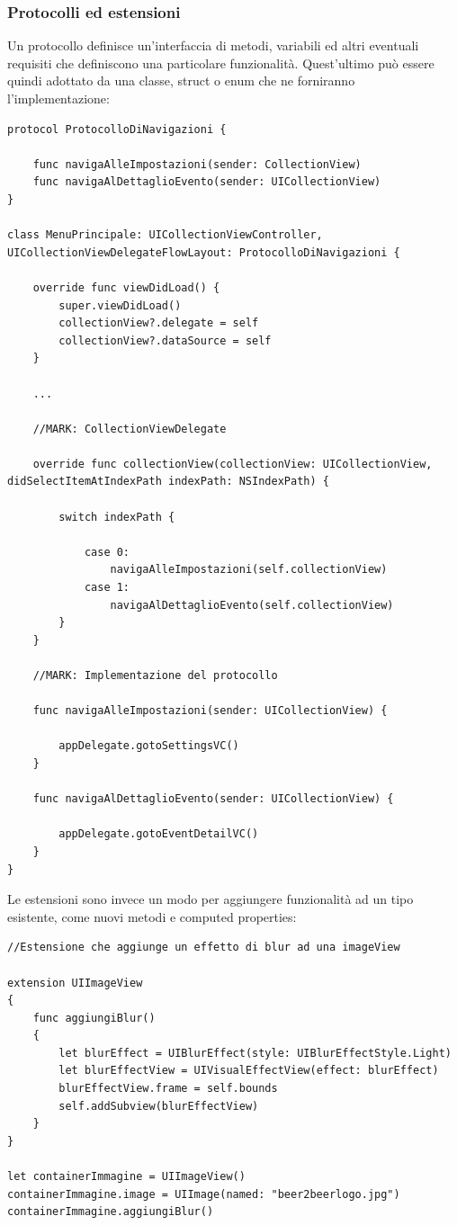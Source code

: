 \subsubsection{Protocolli ed estensioni}
Un protocollo definisce un'interfaccia di metodi, variabili ed altri eventuali requisiti che definiscono una particolare funzionalità. Quest'ultimo può essere quindi adottato da una classe, struct o enum che ne forniranno l'implementazione:
\lstset{language=[Objective]C, breakindent=40pt, breaklines}
\begin{lstlisting}
protocol ProtocolloDiNavigazioni {
	
	func navigaAlleImpostazioni(sender: CollectionView) 
	func navigaAlDettaglioEvento(sender: UICollectionView)
}

class MenuPrincipale: UICollectionViewController, UICollectionViewDelegateFlowLayout: ProtocolloDiNavigazioni {

	override func viewDidLoad() {
        super.viewDidLoad()
		collectionView?.delegate = self
		collectionView?.dataSource = self
	}
	
	...
	
	//MARK: CollectionViewDelegate 
	
	override func collectionView(collectionView: UICollectionView, didSelectItemAtIndexPath indexPath: NSIndexPath) {
		
		switch indexPath {
			
			case 0: 
				navigaAlleImpostazioni(self.collectionView)
			case 1:
				navigaAlDettaglioEvento(self.collectionView)
		}
	}	
		
	//MARK: Implementazione del protocollo 
		
	func navigaAlleImpostazioni(sender: UICollectionView) {
        
        appDelegate.gotoSettingsVC()
    }
    
    func navigaAlDettaglioEvento(sender: UICollectionView) {
        
        appDelegate.gotoEventDetailVC()
    }
}
\end{lstlisting}
Le estensioni sono invece un modo per aggiungere funzionalità ad un tipo esistente, come nuovi metodi e computed properties:
\lstset{language=[Objective]C, breakindent=40pt, breaklines}
\begin{lstlisting}
//Estensione che aggiunge un effetto di blur ad una imageView

extension UIImageView
{
    func aggiungiBlur()
    {
        let blurEffect = UIBlurEffect(style: UIBlurEffectStyle.Light)
        let blurEffectView = UIVisualEffectView(effect: blurEffect)
        blurEffectView.frame = self.bounds
        self.addSubview(blurEffectView)
    }
}

let containerImmagine = UIImageView()
containerImmagine.image = UIImage(named: "beer2beerlogo.jpg")
containerImmagine.aggiungiBlur()
\end{lstlisting}
